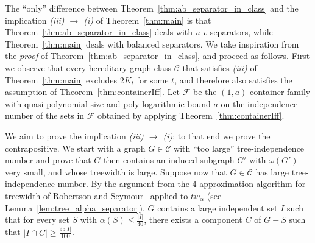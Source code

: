 \documentclass[11pt]{amsart}
\newtheorem{theorem}{Theorem}[section]
\newcommand{\cal}{\mathcal}
\newcommand{\atw}{tw_{\alpha}\xspace}
\begin{document}

The ``only'' difference between Theorem~\ref{thm:ab_separator_in_class} and the implication {\em (iii) $\rightarrow$ (i)} of Theorem~\ref{thm:main} is that Theorem~\ref{thm:ab_separator_in_class} deals with $u$-$v$ separators, while Theorem~\ref{thm:main} deals with balanced separators.
We take inspiration from the {\em proof} of Theorem~\ref{thm:ab_separator_in_class}, and proceed as follows. 
%
First we observe that every hereditary graph class ${\cal C}$ that satisfies {\em (iii)} of Theorem~\ref{thm:main} excludes $\overline{2K_t}$ for some $t$, and therefore also satisfies the assumption of Theorem~\ref{thm:containerIff}. Let ${\cal F}$ be the $(1, a)$-container family with quasi-polynomial size and poly-logarithmic bound $a$ on the independence number of the sets in ${\cal F}$ obtained by applying Theorem~\ref{thm:containerIff}. 

We aim to prove the implication {\em (iii) $\rightarrow$ (i)}; to that end we prove the contrapositive. We start with a graph $G \in {\cal C}$ with ``too large'' tree-independence number and prove that $G$ then  contains an induced subgraph $G'$ with $\omega(G')$ very small, and whose treewidth is large. 
%
Suppose now that $G \in {\cal C}$ has large tree-independence number. By the argument from the $4$-approximation algorithm for treewidth of Robertson and Seymour~\cite{RobertsonS95b} applied to $\atw$ (see Lemma~\ref{lem:tree_alpha_separator}), $G$ contains a large independent set $I$ such that for every set $S$ with $\alpha(S) \leq \frac{|I|}{40}$, there exists a component $C$ of $G - S$ such that $|I \cap C| \geq \frac{95|I|}{100}$. 
\end{document}
